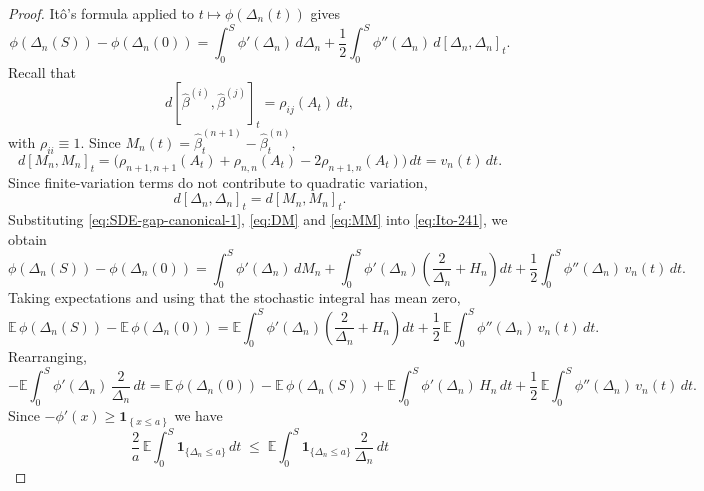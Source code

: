 \documentclass[12pt,reqno]{amsart}
\theoremstyle{plain}
\theoremstyle{definition}
\theoremstyle{remark}
\begin{document}
\begin{proof}
It\^o's formula applied to \(t\mapsto \phi(\Delta_n(t))\) gives 
\begin{equation}
\label{eq:Ito-241}
\phi(\Delta_n(S))-\phi(\Delta_n(0))
=\int_{0}^{S}\phi'(\Delta_n)\,d\Delta_n
+\frac12\int_{0}^{S}\phi''(\Delta_n)\,d[\Delta_n,\Delta_n]_t.
\end{equation}
Recall that 
\begin{equation}
d[ \hat\beta^{(i)},\hat\beta^{(j)} ]_t
=\rho_{ij}(A_t)\,dt ,
\end{equation}
with \(\rho_{ii}\equiv 1\). Since \(M_n(t)=\hat\beta^{(n+1)}_t-\hat\beta^{(n)}_t\),
\begin{equation}
\label{eq:MM}
d[ M_n,M_n ]_t
=\bigl(\rho_{n+1,n+1}(A_t)+\rho_{n,n}(A_t)-2\rho_{n+1,n}(A_t)\bigr)\,dt
= v_n(t)\,dt .
\end{equation}
Since finite-variation terms do not contribute to quadratic variation,
\begin{equation}
\label{eq:DM}
d[\Delta_n ,\Delta_n ]_t=d[ M_n,M_n ]_t .
\end{equation}
Substituting \eqref{eq:SDE-gap-canonical-1}, \eqref{eq:DM} and \eqref{eq:MM} into \eqref{eq:Ito-241}, we obtain
\begin{equation}\label{eq:Ito-phi}
\phi(\Delta_n(S))-\phi(\Delta_n(0))
=\int_0^S \phi'(\Delta_n)\,dM_n
 +\int_0^S \phi'(\Delta_n)\!\left(\frac{2}{\Delta_n}+H_n\right)\!dt
 +\frac12\int_0^S \phi''(\Delta_n)\,v_n(t)\,dt .
\end{equation}
Taking expectations and using that the stochastic integral has mean zero,
\begin{equation}\label{eq:Ito-expect}
\mathbb{E}\,\phi(\Delta_n(S))-\mathbb{E}\,\phi(\Delta_n(0))
=\mathbb{E}\!\int_0^S \phi'(\Delta_n)\!\left(\frac{2}{\Delta_n}+H_n\right)\!dt
+\frac12\,\mathbb{E}\!\int_0^S \phi''(\Delta_n)\,v_n(t)\,dt .
\end{equation}
Rearranging,
\begin{equation}\label{eq:rearrange}
-\mathbb{E}\!\int_0^S \phi'(\Delta_n)\,\frac{2}{\Delta_n}\,dt
=\mathbb{E}\,\phi(\Delta_n(0))-\mathbb{E}\,\phi(\Delta_n(S))
+\mathbb{E}\!\int_0^S \phi'(\Delta_n)\,H_n\,dt
+\frac12\,\mathbb{E}\!\int_0^S \phi''(\Delta_n)\,v_n(t)\,dt .
\end{equation}
Since \(-\phi'(x)\ge \mathbf{1}_{\left \{x \leq a \right \}} \) we have 
\begin{equation}\label{eq:key-lower}
\frac{2}{a}\,\mathbb{E}\!\int_0^S \mathbf{1}_{\{\Delta_n\le a\}}\,dt
\;\le\;
\mathbb{E}\!\int_0^S \mathbf{1}_{\{\Delta_n\le a\}}\,\frac{2}{\Delta_n}\,dt

\end{equation}
\end{proof}
\end{document}
